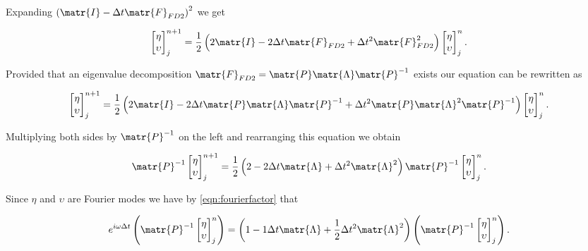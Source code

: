 Expanding $\left(\matr{I} - \Delta t\matr{F}_{FD2} \right)^2$ we get

\begin{equation*}
\begin{bmatrix}
\eta \\ \upsilon
\end{bmatrix}^{n+1}_j = \frac{1}{2} \left(2\matr{I}  -2\Delta t\matr{F}_{FD2} + \Delta t^2\matr{F}^2_{FD2} \right) \begin{bmatrix}
\eta \\ \upsilon
\end{bmatrix}^{n}_j.
\end{equation*}

Provided that an eigenvalue decomposition $\matr{F}_{FD2} = \matr{P} \matr{\Lambda} \matr{P}^{-1} $ exists our equation can be rewritten as 

\begin{equation*}
\begin{bmatrix}
\eta \\ \upsilon
\end{bmatrix}^{n+1}_j = \frac{1}{2} \left(2\matr{I}  -2\Delta t\matr{P} \matr{\Lambda} \matr{P}^{-1}  + \Delta t^2\matr{P} \matr{\Lambda}^2 \matr{P}^{-1} \right) \begin{bmatrix}
\eta \\ \upsilon
\end{bmatrix}^{n}_j.
\end{equation*}

Multiplying both sides by $\matr{P}^{-1}$ on the left and rearranging this equation we obtain

\begin{equation*}
\matr{P}^{-1} \begin{bmatrix}
\eta \\ \upsilon
\end{bmatrix}^{n+1}_j = \frac{1}{2} \left(2 -2\Delta t \matr{\Lambda}  + \Delta t^2 \matr{\Lambda}^2  \right)  \matr{P}^{-1} \begin{bmatrix}
\eta \\ \upsilon
\end{bmatrix}^{n}_j.
\end{equation*}

Since $\eta$ and $\upsilon$ are Fourier modes we have by \eqref{eqn:fourierfactor} that

\begin{equation*}
e^{i\omega \Delta t} \left(\matr{P}^{-1} \begin{bmatrix}
\eta \\ \upsilon
\end{bmatrix}^{n}_j  \right)= \left(1 -1\Delta t \matr{\Lambda}  + \frac{1}{2}\Delta t^2 \matr{\Lambda}^2  \right)  \left(\matr{P}^{-1} \begin{bmatrix}
\eta \\ \upsilon
\end{bmatrix}^{n}_j  \right).
\end{equation*}

